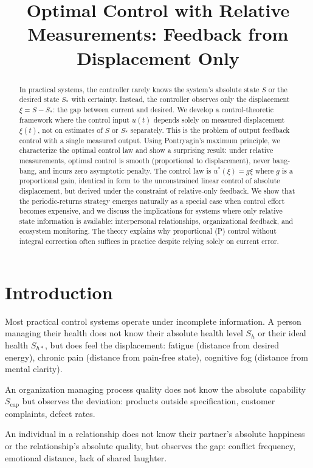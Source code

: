 \documentclass[12pt]{article}
\title{Optimal Control with Relative Measurements: Feedback from Displacement Only}
\author{}
\date{}
\begin{document}
\maketitle

\begin{abstract}
In practical systems, the controller rarely knows the system's absolute state $S$ or the desired state $S_*$ with certainty. Instead, the controller observes only the displacement $\xi = S - S_*$: the gap between current and desired. We develop a control-theoretic framework where the control input $u(t)$ depends solely on measured displacement $\xi(t)$, not on estimates of $S$ or $S_*$ separately. This is the problem of output feedback control with a single measured output. Using Pontryagin's maximum principle, we characterize the optimal control law and show a surprising result: under relative measurements, optimal control is smooth (proportional to displacement), never bang-bang, and incurs zero asymptotic penalty. The control law is $u^*(\xi) = g \xi$ where $g$ is a proportional gain, identical in form to the unconstrained linear control of absolute displacement, but derived under the constraint of relative-only feedback. We show that the periodic-returns strategy emerges naturally as a special case when control effort becomes expensive, and we discuss the implications for systems where only relative state information is available: interpersonal relationships, organizational feedback, and ecosystem monitoring. The theory explains why proportional (P) control without integral correction often suffices in practice despite relying solely on current error.
\end{abstract}

\section{Introduction}

Most practical control systems operate under incomplete information. A person managing their health does not know their absolute health level $S_h$ or their ideal health $S_{h*}$, but does feel the displacement: fatigue (distance from desired energy), chronic pain (distance from pain-free state), cognitive fog (distance from mental clarity).

An organization managing process quality does not know the absolute capability $S_{\text{cap}}$ but observes the deviation: products outside specification, customer complaints, defect rates.

An individual in a relationship does not know their partner's absolute happiness or the relationship's absolute quality, but observes the gap: conflict frequency, emotional distance, lack of shared laughter.
\end{document}
